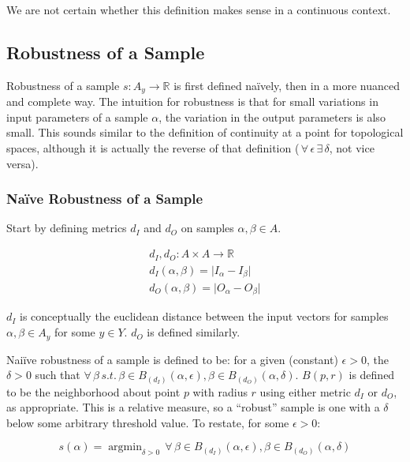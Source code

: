 \documentclass{article}
\DeclareMathOperator*{\argmin}{argmin}
\begin{document}
We are not certain whether this definition makes sense in a continuous context.

\subsection{Robustness of a Sample}
Robustness of a sample $s : A_y \to \mathbb{R}$ is first defined na\"ively, then in a more nuanced and complete way. The intuition for robustness is that for small variations in input parameters of a sample $\alpha$, the variation in the output parameters is also small. This sounds similar to the definition of continuity at a point for topological spaces, although it is actually the reverse of that definition ($\,\forall\, \epsilon \,\exists\, \delta$, not vice versa).

\subsubsection{Na\"ive Robustness of a Sample}

Start by defining metrics $d_I$ and $d_O$ on samples $\alpha, \beta \in A$.

\begin{align}
  d_I, d_O : A \times A \to \mathbb{R} \\
  d_I(\alpha, \beta) = \lvert I_\alpha - I_\beta \rvert \\
  d_O(\alpha, \beta) = \lvert O_\alpha - O_\beta \rvert
\end{align}

$d_I$ is conceptually the euclidean distance between the input vectors for samples $\alpha, \beta \in A_y$ for some $y \in Y$. $d_O$ is defined similarly.

Nai\"ive robustness of a sample is defined to be: for a given (constant) $\epsilon > 0$, the $\delta > 0$ such that $\forall\, \beta \,s.t.\, \beta \in B_{(d_I)}(\alpha, \epsilon), \beta \in B_{(d_O)}(\alpha, \delta)$. $B(p, r)$ is defined to be the neighborhood about point $p$ with radius $r$ using either metric $d_I$ or $d_O$, as appropriate. This is a relative measure, so a ``robust'' sample is one with a $\delta$ below some arbitrary threshold value. To restate, for some $\epsilon > 0$:

\begin{equation}
  s(\alpha) = \argmin_{\delta > 0} \,\forall\, \beta \in B_{(d_I)}(\alpha, \epsilon), \beta \in B_{(d_O)}(\alpha, \delta)
\end{equation}
\end{document}
